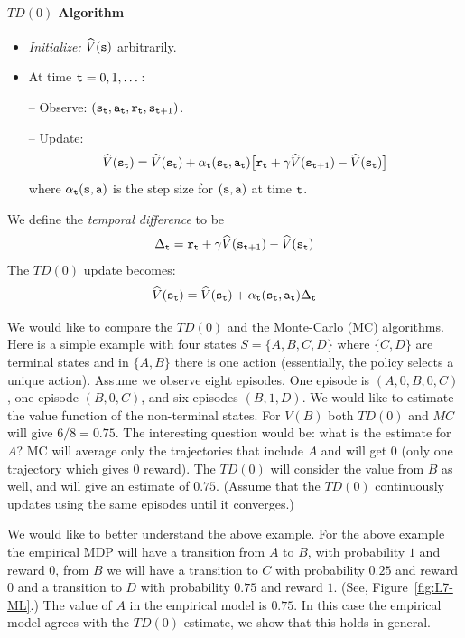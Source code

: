 \paragraph{$TD(0)$ Algorithm}

\begin{itemize}
\item \emph{Initialize:} $\widehat{V}({\tt s})$ arbitrarily.

\item At time ${\tt t}=0,1,\dots$:


-- Observe: $({\tt s}_{\tt t}, {\tt a}_{\tt t}, {\tt r}_{\tt t},
{\tt s}_{{\tt t}+1})$.

-- Update:
\[
\widehat{V}({\tt s}_{\tt t})=\widehat{V}({\tt s}_{\tt t})+\alpha_{\tt t}({\tt s}_{\tt t},{\tt a}_{\tt t})
\big[{\tt r}_{\tt t}+\gamma
\widehat{V}({\tt s}_{{\tt t}+1})-\widehat{V}({\tt s}_{\tt t})\big]
\]
where $\alpha_{\tt t}({\tt s},{\tt a})$ is the step size for
$({\tt s},{\tt a})$ at time ${\tt t}$.
\end{itemize}

We define the {\em temporal difference} to be
\[
\Delta_{\tt t} ={\tt r}_{\tt t}+\gamma
\widehat{V}({\tt s}_{{\tt t}+1})-\widehat{V}({\tt s}_{\tt t})
\]
The $TD(0)$ update becomes:
\[
\widehat{V}({\tt s}_{\tt t})=\widehat{V}({\tt s}_{\tt t})+\alpha_{\tt t}({\tt s}_{\tt t},{\tt a}_{\tt t})\Delta_{\tt t}
\]



We would like to compare the $TD(0)$ and the Monte-Carlo (MC)
algorithms. Here is a simple example with four states
$S=\{A,B,C,D\}$ where $\{C,D\}$ are terminal states and in $\{A,B\}$
there is one action (essentially, the policy selects a unique
action). Assume we observe eight episodes. One episode is
$(A,0,B,0,C)$, one episode $(B,0,C)$, and six episodes $(B,1,D)$. We
would like to estimate the value function of the non-terminal
states. For $V(B)$ both $TD(0)$ and $MC$ will give $6/8=0.75$. The
interesting question would be: what is the estimate for $A$? MC will
average only the trajectories that include $A$ and will get $0$
(only one trajectory which gives $0$ reward). The $TD(0)$ will
consider the value from $B$ as well, and will give an estimate of
$0.75$. (Assume that the $TD(0)$ continuously updates using the same
episodes until it converges.)

We would like to better understand the above example. For the above
example the empirical MDP will have a transition from $A$ to $B$,
with probability $1$ and reward $0$, from $B$ we will have a
transition to $C$ with probability $0.25$ and reward $0$ and a
transition to $D$ with probability $0.75$ and reward $1$. (See,
Figure~\ref{fig:L7-ML}.) The value of $A$ in the empirical model is
$0.75$. In this case the empirical model agrees with the $TD(0)$
estimate, we show that this holds in general.


